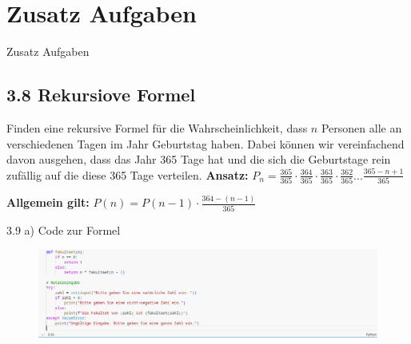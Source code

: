\documentclass{beamer}
\begin{document}
\section{Zusatz Aufgaben}

\begin{frame}{Zusatz Aufgaben}
     \subsection{3.8 Rekursiove Formel}
     Finden eine rekursive Formel für die Wahrscheinlichkeit, dass $n$ Personen alle an
verschiedenen Tagen im Jahr Geburtstag haben.  Dabei können wir vereinfachend davon ausgehen,
dass das Jahr 365 Tage hat und die sich die Geburtstage rein zufällig auf die diese 365 Tage
verteilen.  \newline 
\textbf{Ansatz:} $P_{n} = \frac{365}{365} \cdot \frac{364}{365} \cdot \frac{363}{365} \cdot \frac{362}{365} ... \frac{365 - n + 1}{365} $ 

\newline 
\textbf{Allgemein gilt:} $P(n)  = P(n- 1) \cdot \frac{364 - (n -1)}{365}$
\end{frame}



\begin{frame}{3.9 a) Code zur Formel }
\begin{figure}
    \begin{center}
    \includegraphics[width=1.8\textwidth]{code/aufg3.9a.png}
    \end{center}
\end{figure}
\end{frame}
\end{document}
